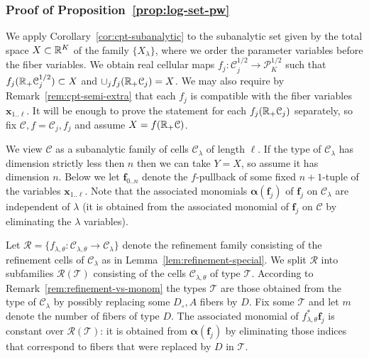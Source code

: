 \documentclass[reqno]{amsart}
\renewcommand\~[1]{\widetilde{#1}}
\def\cP{{\mathcal P}} \def\cR{{\mathcal R}}
\def\cT{{\mathcal T}} \def\cD{{\mathcal D}} \def\cC{{\mathcal C}}
\def\vf{{\mathbf f}}
\def\vx{{\mathbf x}}
\def\valpha{{\boldsymbol\alpha}}
\begin{document}
\subsubsection{Proof of Proposition~\ref{prop:log-set-pw}}
\label{sec:log-set-pw-proof}

We apply Corollary~\ref{cor:cpt-subanalytic} to the subanalytic set
given by the total space $X\subset{\mathbb R}^K$ of the family $\{X_\lambda\}$,
where we order the parameter variables before the fiber variables. We
obtain real cellular maps $f_j:\cC^{1/2}_j\to\cP_K^{1/2}$ such that
$f_j(\R_+\cC_j^{1/2})\subset X$ and $\cup_j f_j(\R_+\cC_j)=X$. We may
also require by Remark~\ref{rem:cpt-semi-extra} that each $f_j$ is
compatible with the fiber variables $\vx_{1..\ell}$. It will be enough
to prove the statement for each $f_j(\R_+\cC_j)$ separately, so fix
$\cC,f=\cC_j,f_j$ and assume $X=f(\R_+\cC)$.

We view $\cC$ as a subanalytic family of cells $\cC_\lambda$ of length
$\ell$. If the type of $\cC_\lambda$ has dimension strictly less then
$n$ then we can take $Y=X$, so assume it has dimension $n$. Below we
let $\vf_{0..n}$ denote the $f$-pullback of some fixed $n+1$-tuple of
the variables $\vx_{1..\ell}$. Note that the associated monomials
$\valpha(\vf_j)$ of $\vf_j$ on $\cC_\lambda$ are independent of
$\lambda$ (it is obtained from the associated monomial of $\vf_j$ on
$\cC$ by eliminating the $\lambda$ variables).

Let $\cR=\{f_{\lambda,\theta}:\cC_{\lambda,\theta}\to\cC_\lambda\}$
denote the refinement family consisting of the refinement cells of
$\cC_\lambda$ as in Lemma~\ref{lem:refinement-special}. We split $\cR$
into subfamilies $\cR(\cT)$ consisting of the cells
$\cC_{\lambda,\theta}$ of type $\cT$. According to
Remark~\ref{rem:refinement-vs-monom} the types $\cT$ are those
obtained from the type of $\cC_\lambda$ by possibly replacing some
$D_\circ,A$ fibers by $D$. Fix some $\cT$ and let $m$ denote the
number of fibers of type $D$. The associated monomial of
$f^*_{\lambda,\theta}\vf_j$ is constant over $\cR(\cT)$: it is
obtained from $\valpha(\vf_j)$ by eliminating those indices that
correspond to fibers that were replaced by $D$ in $\cT$.
\end{document}
